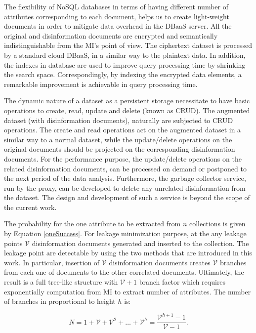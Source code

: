The flexibility of NoSQL databases in terms of having different number of attributes corresponding to each document, helps us to create light-weight documents in order to mitigate data overhead in the DBaaS server. All the original and disinformation documents are encrypted and semantically indistinguishable from the MI’s point of view. The ciphertext dataset is processed by a standard cloud DBaaS, in a similar way to the plaintext data. In addition, the indexes in database are used to improve query processing time by shrinking the search space. Correspondingly, by indexing the encrypted data elements, a remarkable improvement is achievable in query processing time.

The dynamic nature of a dataset as a persistent storage necessitate to have basic operations to create, read, update and delete (known as CRUD). The augmented dataset (with disinformation documents), naturally are subjected to CRUD operations.  The create and read operations act on the augmented dataset in a similar way to a normal dataset, while the update/delete operations on the original documents should be projected on the corresponding disinformation documents. For the performance purpose, the update/delete operations on the related disinformation documents, can be processed on demand or postponed to the next period of the data analysis.
Furthermore, the garbage collector service, run by the proxy, can be developed to delete any unrelated disinformation from the dataset. The design and development of such a service is beyond the scope of the current work. 

The probability for the one attribute to be extracted from $n$ collections is given by Equation \ref{oneSuccess}. For leakage minimization purpose, at the any leakage points $\mathcal{V}$ disinformation documents generated and inserted to the collection. The leakage point are detectable by using the two methods that are introduced in this work. In particular, insertion of $\mathcal{V}$ disinformation documents creates $\mathcal{V}$ branches from each one of documents to the other correlated documents. Ultimately, the result is a full tree-like structure with $\mathcal{V}+1$ branch factor which requires exponentially computation from MI to extract number of attributes. The number of branches in proportional to height $h$ is:    

\begin{equation}
\label{numberOfNodes}
N = 1+\mathcal{V}+ \mathcal{V}^2+ \dots + \mathcal{V}^h= \frac{\mathcal{V}^{h+1}-1}{\mathcal{V}-1}.
\end{equation}


